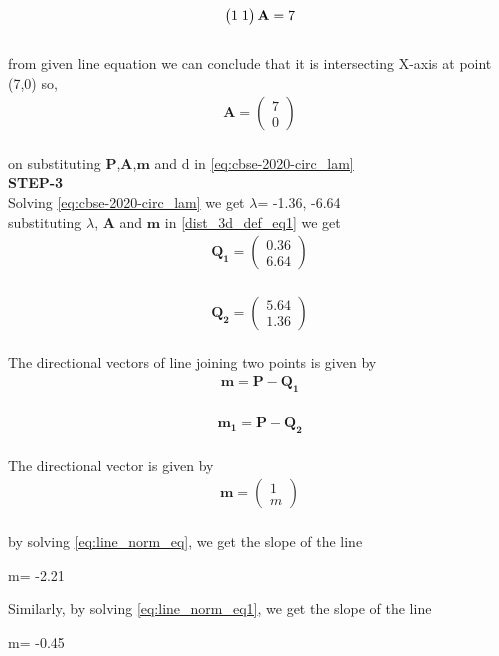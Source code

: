 \documentclass[10pt,a4paper]{report}
\newcommand{\myvec}[1]{\ensuremath{\begin{pmatrix}#1\end{pmatrix}}}
\let\vec\mathbf
\let\vec\mathbf
\begin{document}
\begin{multicols}{2}
\begin{align}
    \label{eq:line_norm_eq}
	\myvec{1 \hspace{1mm} 1} \vec{A}=7
\end{align}\\ 
from given line equation we can conclude that it is intersecting X-axis at point (7,0) so,
\begin{align}
\vec{A} = \myvec{7\\
0} 
\end{align}\\ 
on substituting $\vec{P}$,$\vec{A}$,$\vec{m}$ and d in \eqref{eq:cbse-2020-circ_lam}\\

\textbf{STEP-3}\vspace{2mm}\\
Solving \eqref{eq:cbse-2020-circ_lam} we get $\lambda$= -1.36, -6.64\\
\vspace{5mm}
substituting $\lambda$, $\vec{A}$ and $\vec{m}$ in \eqref{dist_3d_def_eq1} we get
\vspace{2mm}
\begin{align}
\vec{Q_1} = \myvec{0.36\\
6.64}
\end{align}\\
\begin{align}
\vec{Q_2} = \myvec{5.64\\
1.36}
\end{align}\\



The directional vectors of line joining two points is given by \\
\begin{align}
    \label{eq:line_norm_eq}
	\vec{m}={\vec{P}-\vec{Q_1}} 
\end{align}\\
\begin{align}
    \label{eq:line_norm_eq1}
	\vec{m_1}={\vec{P}-\vec{Q_2}} 
\end{align}\\
\vspace{5mm}
The directional vector is given by
\begin{align}
    \vec{m}=\myvec{
    1\\
    m
    } 
\end{align}\\
by solving \eqref{eq:line_norm_eq}, we get the slope of the line\\
\vspace{3mm}
\begin{center}
m= -2.21
\end{center}
Similarly, by solving \eqref{eq:line_norm_eq1}, we get the slope of the line\\
\vspace{3mm}
\begin{center}
m= -0.45
\end{center}





\end{multicols}
\end{document}
